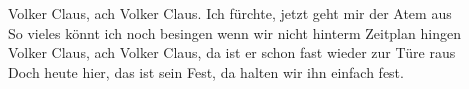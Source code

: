 \documentclass[11pt,a5paper]{article}
\begin{document}
			Volker Claus, ach Volker Claus. Ich fürchte, jetzt geht mir der Atem aus \\
			So vieles könnt ich noch besingen wenn wir nicht hinterm Zeitplan hingen \\
			Volker Claus, ach Volker Claus, da ist er schon fast wieder zur Türe raus \\
			Doch heute hier, das ist sein Fest, da halten wir ihn einfach fest. \\
			
		
\end{document}
